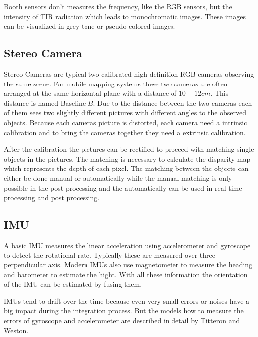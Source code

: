 Booth sensors don't measures the frequency, like the RGB sensors, but the intensity of \ac{TIR} radiation which leads to monochromatic images.
These images can be visualized in grey tone or pseudo colored images.

\subsection{Stereo Camera}\label{ssec:stereoCamera}
Stereo Cameras are typical two calibrated high definition RGB cameras observing the same scene.
For mobile mapping systems these two cameras are often arranged at the same horizontal plane with a distance of $10-12\si{cm}$.
This distance is named Baseline $B$.
Due to the distance between the two cameras each of them sees two slightly different pictures with different angles to the observed objects.
Because each cameras picture is distorted, each camera need a intrinsic calibration and to bring the cameras together they need a extrinsic calibration. 

After the calibration the pictures can be rectified to proceed with matching single objects in the pictures.
The matching is necessary to calculate the disparity map which represents the depth of each pixel.
The matching between the objects can either be done manual or automatically while the manual matching is only possible in the post processing and the automatically can be used in real-time processing and post processing.

\subsection{IMU}\label{ssec:imu}

A basic \ac{IMU} measures the linear acceleration using accelerometer and gyroscope to detect the rotational rate.
Typically these are measured over three perpendicular axis.
Modern \ac{IMU}s also use magnetometer to measure the heading and barometer to estimate the hight.
With all these information the orientation of the \ac{IMU} can be estimated by fusing them.\cite{kim2004}

\ac{IMU}s tend to drift over the time because even very small errors or noises have a big impact during the integration process.
But the models how to measure the errors of gyroscope and accelerometer are described in detail by Titteron and Weston. \cite{titterton2005}

